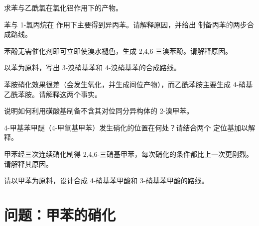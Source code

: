 \begin{exercise}[$\star$]\label{exo:b2:aromatic-substitution:4}
求苯与乙酰氯在氯化铝作用下的产物。
\end{exercise}

\begin{exercise}[$\star\star$]\label{exo:b2:aromatic-substitution:5}
苯与 1-氯丙烷在  作用下主要得到异丙苯。请解释原因，并给出
制备丙苯的两步合成路线。
\end{exercise}

\begin{exercise}[$\star\star$]\label{exo:b2:aromatic-substitution:6}
苯酚无需催化剂即可立即使溴水褪色，生成
2,4,6-三溴苯酚。请解释原因。
\end{exercise}

\begin{exercise}[$\star\star$]\label{exo:b2:aromatic-substitution:7}
以苯为原料，写出 3-溴硝基苯和 4-溴硝基苯的合成路线。
\end{exercise}

\begin{exercise}[$\star\star$]\label{exo:b2:aromatic-substitution:8}
苯胺硝化效果很差（会发生氧化，并生成间位产物），而乙酰苯胺主要生成
4-硝基乙酰苯胺。请解释这两个事实。
\end{exercise}

\begin{exercise}[$\star\star$]\label{exo:b2:aromatic-substitution:9}
说明如何利用磺酸基制备不含其对位同分异构体的 2-溴甲苯。
\end{exercise}

\begin{exercise}[$\star\star\star$]\label{exo:b2:aromatic-substitution:10}
4-甲基苯甲醚（4-甲氧基甲苯）发生硝化的位置在何处？请结合两个
定位基加以解释。
\end{exercise}

\begin{exercise}[$\star\star\star$]\label{exo:b2:aromatic-substitution:11}
甲苯经三次连续硝化制得 2,4,6-三硝基甲苯，每次硝化的条件都比上一次更剧烈。
请解释其原因。
\end{exercise}

\begin{exercise}[$\star\star\star$]\label{exo:b2:aromatic-substitution:12}
请以甲苯为原料，设计合成 4-硝基苯甲酸和 3-硝基苯甲酸的路线。
\end{exercise}

\section{问题：甲苯的硝化}

